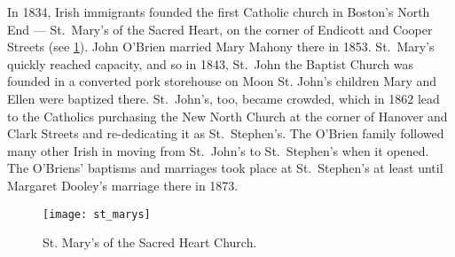 In 1834, Irish immigrants founded the first Catholic church in Boston's North End --- St.\ Mary's of the Sacred Heart, on the corner of Endicott and Cooper Streets\cite{Todisco:26} (see \ref{fig:StMarys}). John O'Brien married Mary Mahony there in 1853.\cite{John2OBrienMarriage:1} St.\ Mary's quickly reached capacity, and so in 1843, St.\ John the Baptist Church was founded in a converted pork storehouse on Moon St.\cite{MoonSt} John's children Mary and Ellen were baptized there. St.\ John's, too, became crowded, which in 1862 lead to the Catholics purchasing the New North Church at the corner of Hanover and Clark Streets and re-dedicating it as St.\ Stephen's.\cite{Sullivan:128:2} The O'Brien family followed many other Irish in moving from St.\ John's to St.\ Stephen's when it opened. The O'Briens' baptisms and marriages took place at St.\ Stephen's at least until Margaret Dooley's marriage there in 1873.\cite{RobertFernaldMarriage:1}


\begin{figure}
	\centering
	\texttt{[image: st\_marys]}
	\caption{St. Mary's of the Sacred Heart Church.}
	\label{fig:StMarys}
\end{figure}

